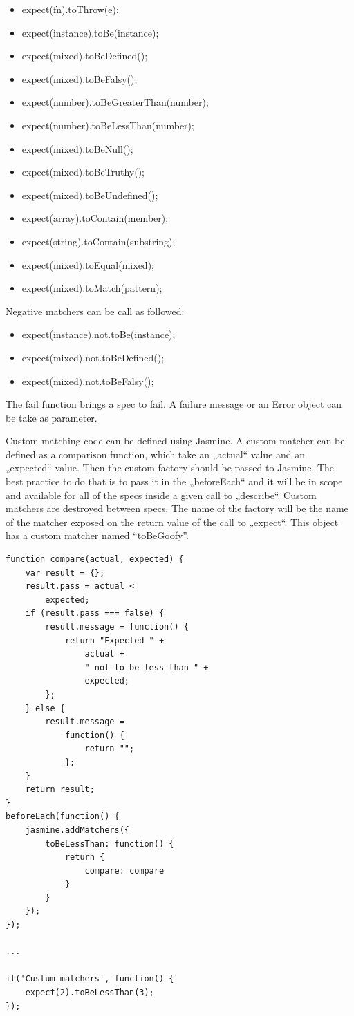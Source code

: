 \documentclass[11pt]{article}
\begin{document}
\begin{itemize}
\item expect(fn).toThrow(e);
\item expect(instance).toBe(instance);
\item expect(mixed).toBeDefined();
\item expect(mixed).toBeFalsy();
\item expect(number).toBeGreaterThan(number);
\item expect(number).toBeLessThan(number);
\item expect(mixed).toBeNull();
\item expect(mixed).toBeTruthy();
\item expect(mixed).toBeUndefined();
\item expect(array).toContain(member);
\item expect(string).toContain(substring);
\item expect(mixed).toEqual(mixed);
\item expect(mixed).toMatch(pattern);
\end{itemize}

Negative matchers can be call as followed:

\begin{itemize}
\item expect(instance).not.toBe(instance);
\item expect(mixed).not.toBeDefined();
\item expect(mixed).not.toBeFalsy();
\end{itemize}

The fail function brings a spec to fail. A failure message or an Error object can be take as parameter.

Custom matching code can be defined using Jasmine. A custom matcher can be defined as a comparison function, which take an „actual“ value and an „expected“ value. Then the custom factory should be passed to Jasmine. The best practice to do that is to pass it in the „beforeEach“ and it will be in scope and available for all of the specs inside a given call to „describe“. Custom matchers are destroyed between specs. The name of the factory will be the name of the matcher exposed on the return value of the call to „expect“. This object has a custom matcher named “toBeGoofy”. 

\begin{lstlisting}[caption=Custom matchers]
function compare(actual, expected) {
    var result = {};
    result.pass = actual <
        expected;
    if (result.pass === false) {
        result.message = function() {
            return "Expected " +
                actual +
                " not to be less than " +
                expected;
        };
    } else {
        result.message =
            function() {
                return "";
            };
    }
    return result;
}
beforeEach(function() {
    jasmine.addMatchers({
        toBeLessThan: function() {
            return {
                compare: compare
            }
        }
    });
});

...

it('Custum matchers', function() {
    expect(2).toBeLessThan(3);
});
\end{lstlisting}
\end{document}
